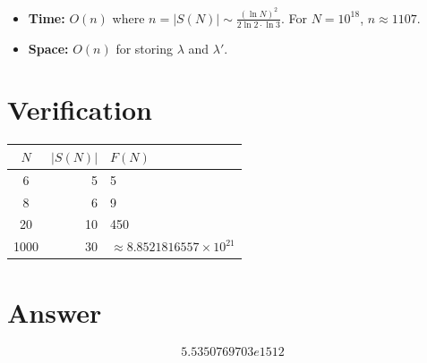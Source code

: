 \documentclass[11pt]{article}
\begin{document}
\begin{itemize}
    \item \textbf{Time:} $O(n)$ where $n = |S(N)| \sim \frac{(\ln N)^2}{2 \ln 2 \cdot \ln 3}$. For $N = 10^{18}$, $n \approx 1107$.
    \item \textbf{Space:} $O(n)$ for storing $\lambda$ and $\lambda'$.
\end{itemize}

\section{Verification}

\begin{center}
\begin{tabular}{crl}
\toprule
$N$ & $|S(N)|$ & $F(N)$ \\
\midrule
6 & 5 & 5 \\
8 & 6 & 9 \\
20 & 10 & 450 \\
1000 & 30 & $\approx 8.8521816557 \times 10^{21}$ \\
\bottomrule
\end{tabular}
\end{center}

\section{Answer}

\[
\boxed{5.5350769703e1512}
\]
\end{document}

